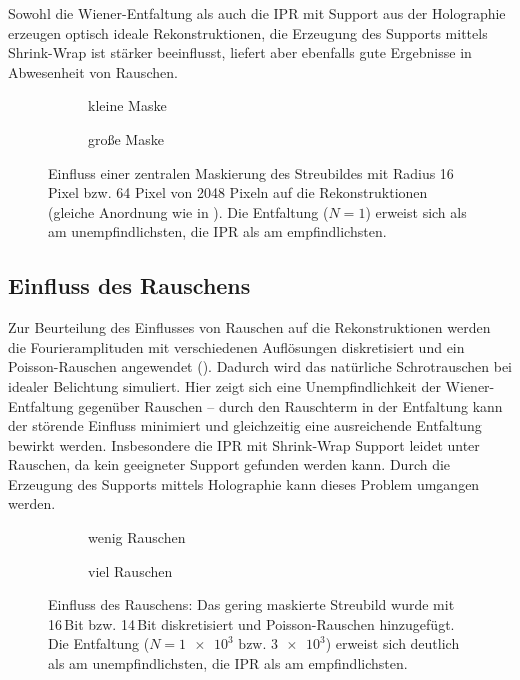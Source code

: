 Sowohl die Wiener-Entfaltung als auch die IPR mit Support aus der Holographie erzeugen optisch ideale Rekonstruktionen, die Erzeugung des Supports mittels Shrink-Wrap ist stärker beeinflusst, liefert aber ebenfalls gute Ergebnisse in Abwesenheit von Rauschen.
\begin{figure}
	\begin{subfigure}[b]{0.48\textwidth}
		\caption{kleine Maske}
	\end{subfigure}
	\hspace*{\fill}
	\begin{subfigure}[b]{0.48\textwidth}
		\caption{große Maske}	
	\end{subfigure}
	\caption[2D Rekonstruktion: Einfluss einer zentralen Maskierung]{Einfluss einer zentralen Maskierung des Streubildes mit Radius 16 Pixel bzw. 64 Pixel von 2048 Pixeln auf die Rekonstruktionen (gleiche Anordnung wie in ). Die Entfaltung ($N=1$) erweist sich als am unempfindlichsten, die IPR als am empfindlichsten.}
	\label{fig:recon2d-mask}
\end{figure}

\subsection{Einfluss des Rauschens}
Zur Beurteilung des Einflusses von Rauschen auf die Rekonstruktionen werden die Fourieramplituden mit verschiedenen Auflösungen diskretisiert und ein Poisson-Rauschen angewendet (). Dadurch wird das natürliche Schrotrauschen bei idealer Belichtung simuliert. Hier zeigt sich eine Unempfindlichkeit der Wiener-Entfaltung gegenüber Rauschen -- durch den Rauschterm in der Entfaltung kann der störende Einfluss minimiert und gleichzeitig eine ausreichende Entfaltung bewirkt werden. Insbesondere die IPR mit Shrink-Wrap Support leidet unter Rauschen, da kein geeigneter Support gefunden werden kann. Durch die Erzeugung des Supports mittels Holographie kann dieses Problem umgangen werden.
\begin{figure}[p]
	\begin{subfigure}[b]{0.45\textwidth}
		\caption{wenig Rauschen}
	\end{subfigure}
	\hspace*{\fill}
	\begin{subfigure}[b]{0.45\textwidth}
		\caption{viel Rauschen}	
	\end{subfigure}
	\caption[2D Rekonstruktion: Einlfuss des Rauschens]{Einfluss des Rauschens: Das gering maskierte Streubild wurde mit 16\,Bit bzw. 14\,Bit diskretisiert und Poisson-Rauschen hinzugefügt. Die Entfaltung ($N=\num{1e3} \text{ bzw. }\num{3e3}$) erweist sich deutlich als am unempfindlichsten, die IPR als am empfindlichsten.}
	\label{fig:recon2d-noise}
\end{figure}
